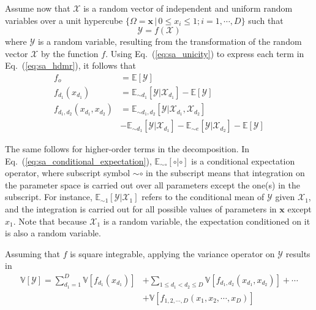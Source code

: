 Assume now that $\bm{\mathcal{X}}$ is a random vector of independent and uniform random variables over a unit hypercube
$\{\Omega = \bm{x} \, | \, 0 \leq x_i  \leq 1; i = 1,\cdots, D\}$ such that
\begin{equation}
	\mathcal{Y} = f(\bm{\mathcal{X}})
\label{eq:sa_random_function}
\end{equation}
where $\mathcal{Y}$ is a random variable, resulting from the transformation of the random vector $\bm{\mathcal{X}}$ by the function $f$.
Using Eq.~(\ref{eq:sa_unicity}) to express each term in Eq.~(\ref{eq:sa_hdmr}), it follows that
\begin{equation}
	\begin{split}
		f_o & = \mathbb{E}[\mathcal{Y}] \\
	  f_{d_1}(x_{d_1}) & = \mathbb{E}_{\sim d_1}[\mathcal{Y}|\mathcal{X}_{d_1}] - \mathbb{E}[\mathcal{Y}]\\
    f_{d_1,d_2}(x_{d_1},x_{d_2}) & = \mathbb{E}_{\sim d_1,d_2} [\mathcal{Y}|\mathcal{X}_{d_1}, \mathcal{X}_{d_2}] \\
																 & - \mathbb{E}_{\sim d_1}[\mathcal{Y}|\mathcal{X}_{d_1}] - \mathbb{E}_{\sim e}[\mathcal{Y}|\mathcal{X}_{d_2}] - \mathbb{E}[\mathcal{Y}] 
	\end{split}
\label{eq:sa_conditional_expectation}
\end{equation}

The same follows for higher-order terms in the decomposition. 
In Eq.~(\ref{eq:sa_conditional_expectation}),
$\mathbb{E}_{\sim \circ} [\circ|\circ]$ is a conditional expectation operator,
where subscript symbol $\sim\circ$ in the subscript means that integration on the parameter space is carried out over all parameters except the one(s) in the subscript.
For instance, $\mathbb{E}_{\sim 1} [\mathcal{Y}|\mathcal{X}_1]$ refers to the conditional mean of $\mathcal{Y}$ given $\mathcal{X}_1$, and the integration is carried out for all possible values of parameters in $\mathbf{x}$ except $x_1$.
Note that because $\mathcal{X}_1$ is a random variable, the expectation conditioned on it is also a random variable.

Assuming that $f$ is square integrable, applying the variance operator on $\mathcal{Y}$ results in
\begin{equation}
	\begin{split}
		\mathbb{V}[\mathcal{Y}] = \sum_{d_1=1}^{D} \mathbb{V}[f_{d_1} (x_{d_1})] & + \sum_{1 \leq d_1 < d_2 \leq D} \mathbb{V} [f_{d_1,d_2} (x_{d_1}, x_{d_2})] + \cdots \\
	                                                       & + \mathbb{V} [f_{1,2,\cdots,D} (x_1, x_2, \cdots, x_D)]
		\end{split}
\label{eq:sa_variance_decomposition}
\end{equation}

